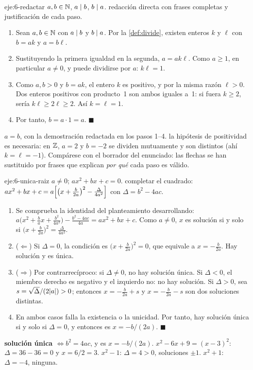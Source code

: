 \begin{solucion}{eje:6-redactar}
\datos $a,b\in\mathbb{N}$, $a\mid b$, $b\mid a$.
\planteamiento redacción directa con frases completas y justificación de cada paso.
\pasos
\begin{enumerate}[label=\arabic*.]
  \item Sean $a,b\in\mathbb{N}$ con $a\mid b$ y $b\mid a$. Por la \cref{def:divide}, existen enteros $k$ y $\ell$ con $b=ak$ y $a=b\ell$.
  \item Sustituyendo la primera igualdad en la segunda, $a=ak\ell$. Como $a\ge 1$, en particular $a\neq 0$, y puede dividirse por $a$: $k\ell=1$.
  \item Como $a,b>0$ y $b=ak$, el entero $k$ es positivo, y por la misma razón $\ell>0$. Dos enteros positivos con producto~1 son ambos iguales a~1: si fuera $k\ge 2$, sería $k\ell\ge 2\ell\ge 2$. Así $k=\ell=1$.
  \item Por tanto, $b=a\cdot 1=a$. $\blacksquare$
\end{enumerate}
\resultado \textbf{$a=b$}, con la demostración redactada en los pasos 1–4.
\comprobacion la hipótesis de positividad es necesaria: en $\mathbb{Z}$, $a=2$ y $b=-2$ se dividen mutuamente y son distintos (ahí $k=\ell=-1$). Compárese con el borrador del enunciado: las flechas se han sustituido por frases que explican \emph{por qué} cada paso es válido.
\end{solucion}

\begin{solucion}{eje:6-unica-raiz}
\datos $a\neq 0$; $ax^{2}+bx+c=0$.
\planteamiento completar el cuadrado: $ax^{2}+bx+c=a\Bigl[\bigl(x+\tfrac{b}{2a}\bigr)^{2}-\tfrac{\Delta}{4a^{2}}\Bigr]$ con $\Delta=b^{2}-4ac$.
\pasos
\begin{enumerate}[label=\arabic*.]
  \item Se comprueba la identidad del planteamiento desarrollando: $a\bigl(x^{2}+\tfrac{b}{a}x+\tfrac{b^{2}}{4a^{2}}\bigr)-\tfrac{b^{2}-4ac}{4a}=ax^{2}+bx+c$. Como $a\neq 0$, $x$ es solución si y solo si $\bigl(x+\tfrac{b}{2a}\bigr)^{2}=\tfrac{\Delta}{4a^{2}}$.
  \item ($\Leftarrow$) Si $\Delta=0$, la condición es $\bigl(x+\tfrac{b}{2a}\bigr)^{2}=0$, que equivale a $x=-\tfrac{b}{2a}$. Hay solución y es única.
  \item ($\Rightarrow$) Por contrarrecíproco: si $\Delta\neq 0$, no hay solución única. Si $\Delta<0$, el miembro derecho es negativo y el izquierdo no: no hay solución. Si $\Delta>0$, sea $s=\sqrt{\Delta}/(2\lvert a\rvert)>0$; entonces $x=-\tfrac{b}{2a}+s$ y $x=-\tfrac{b}{2a}-s$ son dos soluciones distintas.
  \item En ambos casos falla la existencia o la unicidad. Por tanto, hay solución única si y solo si $\Delta=0$, y entonces es $x=-b/(2a)$. $\blacksquare$
\end{enumerate}
\resultado \textbf{solución única $\iff b^{2}=4ac$}, y es $x=-b/(2a)$.
\comprobacion $x^{2}-6x+9=(x-3)^{2}$: $\Delta=36-36=0$ y $x=6/2=3$. $x^{2}-1$: $\Delta=4>0$, soluciones $\pm1$. $x^{2}+1$: $\Delta=-4$, ninguna.
\end{solucion}
